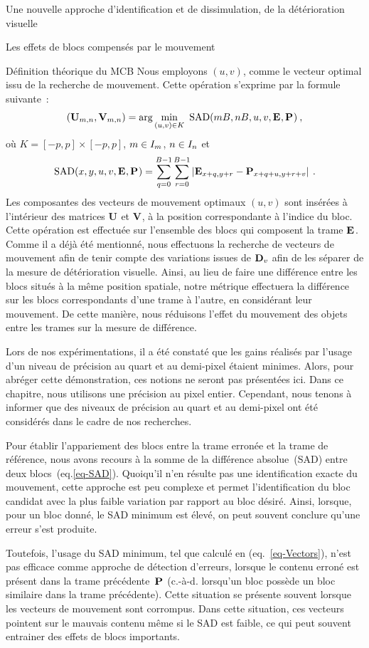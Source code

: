 \begin{chapter}{Une nouvelle approche d'identification et de dissimulation, de
la détérioration visuelle}
\begin{section}{Les effets de blocs compensés par le mouvement}
\begin{subsection}{Définition théorique du MCB}
Nous employons $(u,v)$, comme le vecteur optimal issu de la recherche de
mouvement. Cette opération s'exprime par la formule suivante~: 
\begin{equation}
\label{eq-Vectors}
(\mathbf{U}_{m,n}, \mathbf{V}_{m,n}) = \arg \min_{(u,v) \in K} ~ \textrm{SAD}(mB, nB, u,
v, \mathbf{E}_{}, \mathbf{P}_{}) \:,
\end{equation}
où $K = [-p,p] \times [-p, p]$,  $m \in I_{m}$, $n \in
I_{n}$ et
\begin{equation}
\label{eq-SAD}
\textrm{SAD}(x,y,u,v, \mathbf{E}_{}, \mathbf{P}_{}) = \sum_{q=0}^{B-1}\sum_{r=0}^{B-1} \left|
\mathbf{E}_{x+q,y+r} - \mathbf{P}_{x+q+u,y+r+v} \right|\:.
\end{equation}
Les composantes des vecteurs de mouvement optimaux $(u,v)$ sont insérées à
l'intérieur des matrices $\mathbf{U}_{}$ et $\mathbf{V}_{}$, à la position
correspondante à l'indice du bloc. Cette opération est effectuée sur l'ensemble
des blocs qui composent la trame $\mathbf{E}_{}$. Comme il a déjà été mentionné, nous
effectuons la recherche de vecteurs de mouvement afin de tenir compte des
variations issues de $\mathbf{D}_{v}$ afin de les séparer de la mesure de détérioration
visuelle. Ainsi, au lieu de faire une différence entre les blocs situés à la
même position spatiale, notre métrique effectuera la différence sur les blocs
correspondants d'une trame à l'autre, en considérant leur mouvement. De cette
manière, nous réduisons l'effet du mouvement des objets entre les trames sur la
mesure de différence.

Lors de nos expérimentations, il a été constaté que les gains réalisés par
l'usage d'un niveau de précision au quart et au demi-pixel étaient minimes.
Alors, pour abréger cette démonstration, ces notions ne seront pas présentées
ici. Dans ce chapitre, nous utilisons une précision au pixel entier. Cependant,
nous tenons à informer que des niveaux de précision au quart et au demi-pixel
ont été considérés dans le cadre de nos recherches.

Pour établir l'appariement des blocs entre la trame erronée et la trame de
référence, nous avons recours à la somme de la différence absolue~(SAD) entre
deux blocs~(eq.\ref{eq-SAD}). Quoiqu'il n'en résulte pas une identification
exacte du mouvement, cette approche est peu complexe et permet l'identification
du bloc candidat avec la plus faible variation par rapport au bloc désiré.
Ainsi, lorsque, pour un bloc donné, le SAD minimum est élevé, on peut souvent
conclure qu'une erreur s'est produite.

Toutefois, l'usage du SAD minimum, tel que calculé en (eq.~\ref{eq-Vectors}),
n'est pas efficace comme approche de détection d'erreurs, lorsque le contenu erroné
est présent dans la trame précédente~$\mathbf{P}_{}$ (c.-à-d. lorsqu'un bloc possède un
bloc similaire dans la trame précédente). Cette situation se présente souvent
lorsque les vecteurs de mouvement sont corrompus. Dans cette situation, ces
vecteurs pointent sur le mauvais contenu même si le SAD est faible, ce qui peut
souvent entrainer des effets de blocs importants.


\end{subsection}
\end{section}
\end{chapter}
